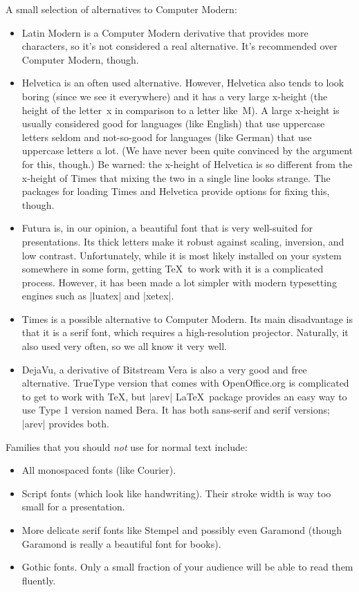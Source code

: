 A small selection of alternatives to Computer Modern:
\begin{itemize}
\item
  Latin Modern is a Computer Modern derivative that provides more characters, so it's not considered a real alternative. It's recommended over Computer Modern, though.
\item
  Helvetica is an often used alternative. However, Helvetica also tends to look boring (since we see it everywhere) and it has a very large x-height (the height of the letter~x in comparison to a letter like~M). A large x-height is usually considered good for languages (like English) that use uppercase letters seldom and not-so-good for languages (like German) that use uppercase letters a lot. (We have never been quite convinced by the argument for this, though.) Be warned: the x-height of Helvetica is so different from the x-height of Times that mixing the two in a single line looks strange. The packages for loading Times and Helvetica provide options for fixing this, though.
\item
  Futura is, in our opinion, a beautiful font that is very well-suited for presentations. Its thick letters make it robust against scaling, inversion, and low contrast. Unfortunately, while it is most likely installed on your system somewhere in some form, getting \TeX\ to work with it is a complicated process. However, it has been made a lot simpler with modern typesetting engines such as |luatex| and |xetex|.
\item
  Times is a possible alternative to Computer Modern. Its main disadvantage is that it is a serif font, which requires a high-resolution projector. Naturally, it also used very often, so we all know it very well.
\item
  DejaVu, a derivative of Bitstream Vera is also a very good and free alternative. TrueType version that comes with OpenOffice.org is complicated to get to work with \TeX, but |arev| \LaTeX\ package provides an easy way to use Type 1 version named Bera. It has both sans-serif and serif versions; |arev| provides both.
\end{itemize}

Families that you should \emph{not} use for normal text include:
\begin{itemize}
\item
  All monospaced fonts (like Courier).
\item
  Script fonts (which look like handwriting). Their stroke width is way too small for a presentation.
\item
  More delicate serif fonts like Stempel and possibly even Garamond (though Garamond is really a beautiful font for books).
\item
  Gothic fonts. Only a small fraction of your audience will be able to read them fluently.
\end{itemize}

